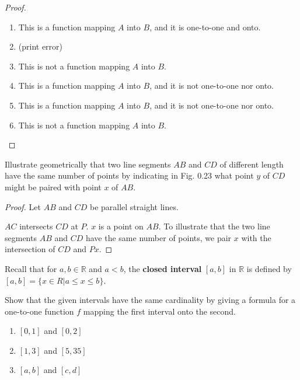 \begin{proof}
    \begin{enumerate}[label={\textbf{\alph*.}},itemsep=0pt]
        \item This is a function mapping $A$ into $B$, and it is one-to-one and onto.
        \item (print error)
        \item This is not a function mapping $A$ into $B$.
        \item This is a function mapping $A$ into $B$, and it is not one-to-one nor onto.
        \item This is a function mapping $A$ into $B$, and it is not one-to-one nor onto.
        \item This is not a function mapping $A$ into $B$.
    \end{enumerate}
\end{proof}

\begin{exercise}
    Illustrate geometrically that two line segments $AB$ and $CD$ of different length have the same number of points by indicating in Fig. 0.23 what point $y$ of $CD$ might be paired with point $x$ of $AB$.
\end{exercise}

\begin{proof}
    Let $AB$ and $CD$ be parallel straight lines.

    $AC$ intersects $CD$ at $P$. $x$ is a point on $AB$. To illustrate that the two line segments $AB$ and $CD$ have the same number of points, we pair $x$ with the intersection of $CD$ and $Px$.
\end{proof}

\begin{exercise}
    Recall that for $a, b \in\mathbb{R}$ and $a < b$, the \textbf{closed interval} $[a, b]$ in $\mathbb{R}$ is defined by $[a, b] = \{ x \in R \vert a \le x \le b \}$.

    Show that the given intervals have the same cardinality by giving a formula for a one-to-one function $f$ mapping the first interval onto the second.
    \begin{enumerate}[label={\textbf{\alph*.}},itemsep=0pt]
        \item $[0, 1]$ and $[0, 2]$
        \item $[1, 3]$ and $[5, 35]$
        \item $[a, b]$ and $[c, d]$
    \end{enumerate}
\end{exercise}

